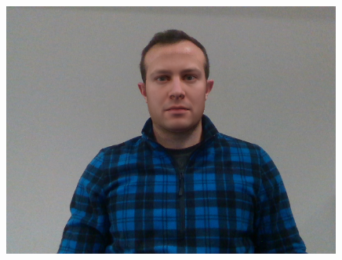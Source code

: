 \begin{figure}[h]
\begin{minipage}{.325\textwidth}
      \includegraphics[width=0.99\textwidth]{Figures/dataset/blended/3.png}
    \end{minipage}


\end{figure}
